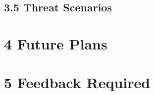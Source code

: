 \documentclass[11pt, a4paper, twoside, openright, notitlepage]{report}
\begin{document}
\subsection*{3.5 Threat Scenarios}





\section*{4 Future Plans}





\section*{5 Feedback Required}






\backmatter


%

\end{document}
